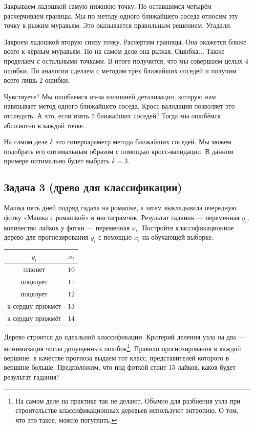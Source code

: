 \documentclass[12pt, a4paper, oneside]{article}
\theoremstyle{plain} %
\theoremstyle{definition}
\begin{document}
{\begin{enumerate}
		Закрываем ладошкой самую нижнюю точку. По оставшимся четырём расчерчиваем границы. Мы по методу одного ближайшего соседа относим эту точку к рыжим муравьям. Это оказывается правильным решением. Угадали.
		
		Закроем ладошкой вторую снизу точку. Расчертим границы. Она окажется ближе всего к чёрным муравьям. Но на самом деле она рыжая. Ошибка... Также проделаем с остальными точками. В итоге получится, что мы совершаем целых $4$ ошибки. По аналогии сделаем с методом трёх ближайших соседей и получим всего лишь $2$ ошибки. 
		
		Чувствуете? Мы ошибаемся из-за излишней детализации, которую нам навязывает метод одного ближайшего соседа. Кросс-валидация позволяет это отследить. А что, если взять $5$ ближайших соседей? Тогда мы ошибёмся абсолютно в каждой точке.
		
		На самом деле $k$ это гиперпараметр метода ближайших соседей. Мы можем подобрать его оптимальным образом с помощью кросс-валидации. В данном примере оптимально будет выбрать $k=3$.  
	\end{enumerate}
}



\subsection*{Задача 3 (древо для классификации)}

Машка пять дней подряд гадала на ромашке, а затем выкладывала очередную фотку «Машка с ромашкой» в инстаграмчик. Результат гадания — переменная $y_i$, количество лайков у фотки — переменная $x_i$. Постройте классификационное дерево для прогнозирования $y_i$ с помощью $x_i$ на обучающей выборке:

\begin{center}
	\begin{tabular}{cc}
		$y_i$ & $x_i$ \\
		\hline
		плюнет & $10$ \\
		поцелует & $11$ \\
		поцелует & $12$ \\
		к сердцу прижмёт & $13$ \\
		к сердцу прижмёт & $14$ \\
	\end{tabular}
\end{center}

Дерево строится до идеальной классификации. Критерий деления узла на два — минимизация числа допущенных ошибок\footnote{На самом деле на практике так не делают. Обычно для разбиения узла при строительстве классификационных деревьев используют энтропию. О том, что это такое, можно погуглить.}.  Правило прогнозирования в каждой вершине: в качестве прогноза выдаем тот класс, представителей которого в вершине больше.  Предположим, что под фоткой стоит 15 лайков, каков будет результат гадания? 
\end{document}

